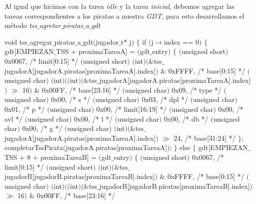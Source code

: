 Al igual que hicimos con la tarea \textit{idle} y la tarea \textit{inicial}, debemos agregar las tareas correspondientes a los piratas a nuestra \textit{GDT}, para esto desarrollamos el m\'etodo \textit{tss$\_$agretar$\_$piratas$\_$a$\_$gdt}

\begin{algorithmic}
\State \tab  void tss$\_$agregar$\_$piratas$\_$a$\_$gdt$($jugador$\_$t* j$)$ $\{$
\State \tab \tab    if $($j$\to$index == 0$)$  $\{$
\State \tab \tab      gdt[EMPIEZAN$\_$TSS + proximaTareaA] = $($gdt$\_$entry$)$ $\{$
\State \tab \tab \tab       $($unsigned short$)$    0x0067,         /* limit[0:15]  */
\State \tab \tab \tab       $($unsigned short$)$    $($int$)$$($$\&$tss$\_$jugadorA[jugadorA.piratas[proximaTareaA].index]$)$ $\&$ 0xFFFF, /* base[0:15]   */
\State \tab \tab \tab       $($unsigned char$)$     $($int$)$$($$($int$)$$($$\&$tss$\_$jugadorA[jugadorA.piratas[proximaTareaA].index]$)$ $\gg$ 16$)$ $\&$ 0x00FF,           /* base[23:16]  */
\State \tab \tab \tab       $($unsigned char$)$     0x09,           /* type         */
\State \tab \tab \tab       $($unsigned char$)$     0x00,           /* s            */
\State \tab \tab \tab       $($unsigned char$)$     0x03,           /* dpl          */
\State \tab \tab \tab       $($unsigned char$)$     0x01,           /* p            */
\State \tab \tab \tab       $($unsigned char$)$     0x00,           /* limit[16:19] */
\State \tab \tab \tab       $($unsigned char$)$     0x00,           /* avl          */
\State \tab \tab \tab       $($unsigned char$)$     0x00,           /* l            */
\State \tab \tab \tab       $($unsigned char$)$     0x00,           /* db           */
\State \tab \tab \tab       $($unsigned char$)$     0x00,           /* g            */
\State \tab \tab \tab       $($unsigned char$)$     $($int$)$$($$\&$tss$\_$jugadorA[jugadorA.piratas[proximaTareaA].index]$)$ $\gg$ 24,           /* base[31:24]  */
\State \tab \tab \tab     $\}$;
\State \tab \tab \tab     completarTssPirata$($jugadorA.piratas[proximaTareaA]$)$;
\State \tab \tab \tab   $\}$ else $\{$
\State \tab \tab \tab     gdt[EMPIEZAN$\_$TSS + 8 + proximaTareaB] = $($gdt$\_$entry$)$ $\{$
\State \tab \tab \tab       $($unsigned short$)$    0x0067,         /* limit[0:15]  */
\State \tab \tab \tab       $($unsigned short$)$    $($int$)$$($$\&$tss$\_$jugadorB[jugadorB.piratas[proximaTareaB].index]$)$ $\&$ 0xFFFF, /* base[0:15]   */
\State \tab \tab \tab       $($unsigned char$)$     $($int$)$$($$($int$)$$($$\&$tss$\_$jugadorB[jugadorB.piratas[proximaTareaB].index]$)$ $\gg$ 16$)$ $\&$ 0x00FF,           /* base[23:16]  */

\end{algorithmic}
